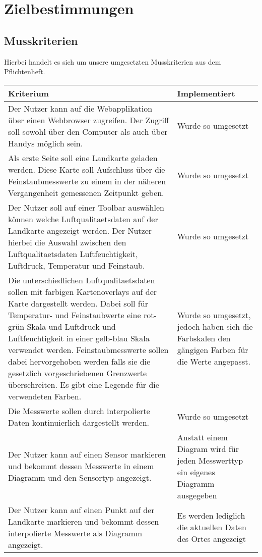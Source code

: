 \section{Zielbestimmungen}
\subsection{Musskriterien}
    Hierbei handelt es sich um unsere umgesetzten Musskriterien aus dem Pflichtenheft.
    \begin{tabularx}{\textwidth}{| X | X |}
    \hline
    \textbf{Kriterium} & 
    \textbf{Implementiert}\\
    \hline
    Der Nutzer kann auf die Webapplikation über einen Webbrowser zugreifen. Der Zugriff soll sowohl über den Computer als auch über Handys möglich sein. & Wurde so umgesetzt \\
    \hline
    Als erste Seite soll eine Landkarte geladen werden. Diese Karte soll Aufschluss über die \gls{Feinstaub}messwerte zu einem in der näheren Vergangenheit gemessenen Zeitpunkt geben. & Wurde so umgesetzt \\
    \hline
    Der Nutzer soll auf einer Toolbar auswählen können welche \gls{Luftqualitaetsdaten} auf der Landkarte angezeigt werden. Der Nutzer hierbei die Auswahl zwischen den \gls{Luftqualitaetsdaten} Luftfeuchtigkeit, Luftdruck, Temperatur und \gls{Feinstaub}. & Wurde so umgesetzt \\
    \hline
    Die unterschiedlichen \gls{Luftqualitaetsdaten} sollen mit farbigen Kartenoverlays auf der Karte dargestellt werden. Dabei soll für Temperatur- und \gls{Feinstaub}werte eine rot-grün Skala und Luftdruck und Luftfeuchtigkeit in einer gelb-blau Skala verwendet werden. \gls{Feinstaub}messwerte sollen dabei hervorgehoben werden falls sie die gesetzlich vorgeschriebenen Grenzwerte überschreiten.
    Es gibt eine Legende für die verwendeten Farben. & Wurde so umgesetzt, jedoch haben sich die Farbskalen den gängigen Farben für die Werte angepasst. \\
    \hline
    Die Messwerte sollen durch interpolierte Daten kontinuierlich dargestellt werden. & Wurde so umgesetzt \\
    \hline
    Der Nutzer kann auf einen Sensor markieren und bekommt dessen Messwerte in einem Diagramm und den Sensortyp angezeigt. & Anstatt einem Diagram wird für jeden Messwerttyp ein eigenes Diagramm ausgegeben \\
    \hline
    Der Nutzer kann auf einen Punkt auf der Landkarte markieren und bekommt dessen interpolierte Messwerte als Diagramm angezeigt. & Es werden lediglich die aktuellen Daten des Ortes angezeigt \\

\end{tabularx}
